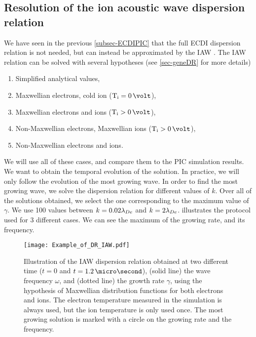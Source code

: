   \FloatBarrier
  \subsection{Resolution of the ion acoustic wave dispersion relation} \label{subsec-VDFIAW}
  
  We have seen in the previous \cref{subsec-ECDIPIC} that the full \ac{ECDI} dispersion relation is not needed, but can instead be approximated by the \ac{IAW} \citep{lafleur2018,janhunen2018,taccogna2019}.
  The \ac{IAW} relation can be solved with several hypotheses (see \cref{sec-geneDR} for more details)
  \begin{enumerate}
    \item Simplified analytical values,
    \item Maxwellian electrons, cold ion ($\Ti = 0\,\volt$),
    \item Maxwellian electrons and ions ($\Ti > 0\,\volt$),
    \item Non-Maxwellian electrons, Maxwellian ions ($\Ti > 0\,\volt$),
    \item Non-Maxwellian electrons and ions.
  \end{enumerate}
  
  We will use all of these cases, and compare them to the \ac{PIC} simulation results.
  We want to obtain the temporal evolution of the solution.
  In practice, we will only follow the evolution of the most growing wave.
  In order to find the most growing wave, we solve the dispersion relation for different values of $k$.
  Over all of the solutions obtained, we select the one corresponding to the maximum value of $\gamma$.
  We use 100 values between $k=0.02 \lambda_{De}$ and $k = 2 \lambda_{De}$.
   illustrates the protocol used for 3 different cases.
  We can see the maximum of the growing rate, and its frequency.
  
  \begin{figure}[hbt]
    \centering
    \texttt{[image: Example\_of\_DR\_IAW.pdf]}
    \caption{Illustration of the \acs{IAW} dispersion relation obtained at two different time ($t=0$ and $t=1.2\,\micro\second$), (solid line) the wave frequency $\omega$, and (dotted line) the growth rate $\gamma$, using the hypothesis of Maxwellian distribution functions for both electrons and ions. The electron temperature measured in the simulation is always used, but the ion temperature is only used once. The most growing solution is marked with a circle on the growing rate and the frequency.}
    \label{fig-Example_of_DR_IAW}
  \end{figure}
  
